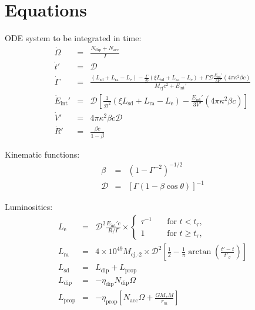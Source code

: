 \documentclass[11pt]{article} %
\newcommand{\tx}[1]{\textrm{#1}}
\begin{document}
\section{Equations}

ODE system to be integrated in time:
\begin{eqnarray}
\dot{\Omega}    &=& \frac{N_\tx{dip}+N_\tx{acc}}{I} \\
\dot{t}'               &=& \mathcal{D} \\
\dot{\Gamma}   &=& \frac{(L_\tx{sd}+L_\tx{ra}-L_\tx{e})-
                                             \tfrac{\Gamma}{\mathcal{D}}(\xi L_\tx{sd}+L_\tx{ra}-L_\tx{e})+
                                             \Gamma\mathcal{D}\tfrac{E_\tx{int}'}{3V'}(4\pi\kappa^2\beta c)}
                                           {M_\tx{ej}c^2+E_\tx{int}'} \\
\dot{E}_\tx{int}' &=& \mathcal{D}\left[\tfrac{1}{\mathcal{D}^2}(\xi L_\tx{sd}+L_\tx{ra}-L_\tx{e})-
                                                               \tfrac{E_\tx{int}'}{3V'}(4\pi\kappa^2\beta c)\right] \\
\dot{V}'             &=& 4\pi\kappa^2\beta c \mathcal{D} \\
\dot{R}'             &=& \frac{\beta c}{1-\beta}
\end{eqnarray}

Kinematic functions:
\begin{eqnarray}
\beta		 	&=& (1-\Gamma^{-2})^{-1/2} \\
\mathcal{D}      	&=& [\Gamma(1-\beta\cos\theta)]^{-1} 
\end{eqnarray}

Luminosities:
\begin{eqnarray}
L_\tx{e}		&=& \mathcal{D}^2\frac{E_\tx{int}'c}{R/\Gamma}\times
                                   \left\{\begin{array}{ll} 
                                   \tau^{-1}&\quad\tx{for\ }t<t_\tau, \\
                                  1 &\quad\tx{for\ }t\geq t_\tau,  \end{array}\right. \\
L_\tx{ra}		&=& 4\times10^{49}M_\tx{ej,-2}\times
                                  \mathcal{D}^2\left[\frac{1}{2}-\frac{1}{\pi}\arctan\left(\frac{t'-t}{t'_\sigma}\right)\right] \\
L_\tx{sd}		&=& L_\tx{dip}+L_\tx{prop} \\
L_\tx{dip}		&=& -\eta_\tx{dip} N_\tx{dip} \Omega \\
L_\tx{prop}	&=& -\eta_\tx{prop}[ N_\tx{acc} \Omega +\tfrac{GM_*\dot{M}}{r_m}]  
\end{eqnarray} 
\end{document}
